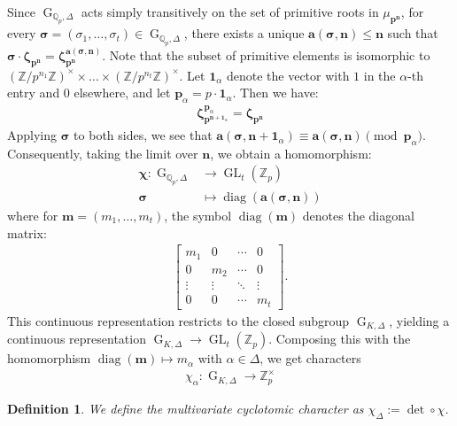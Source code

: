 \documentclass{amsart}
\newtheorem{definition}[proposition]{Definition}
\newcommand{\bn}{\textbf{n}}
\newcommand{\bm}{\textbf{m}}
\newcommand{\bp}{\textbf{p}}
\newcommand{\ba}{\textbf{a}}
\DeclareMathOperator{\G}{G}
\DeclareMathOperator{\GL}{GL}
\DeclareMathOperator{\diag}{diag}
\begin{document}
Since $\G_{\mathbb{Q}_p,\Delta}$ acts simply transitively on the set of primitive roots in $\mu_{\bp^{\bn}}$, for every $\boldsymbol\sigma=(\sigma_1,\dots,\sigma_t) \in \G_{\mathbb{Q}_p,\Delta}$, there exists a unique $\ba(\boldsymbol\sigma,\bn) \leq \bn$ such that $\boldsymbol\sigma \cdot \boldsymbol\zeta_{\bp^\bn} = \boldsymbol\zeta^{\ba(\boldsymbol\sigma,\bn)}_{\bp^{\bn}}$. Note that the subset of primitive elements is isomorphic to $(\mathbb{Z}/p^{n_1}\mathbb{Z})^{\times} \times \dots \times (\mathbb{Z}/p^{n_t}\mathbb{Z})^\times$. Let $\boldsymbol{1}_\alpha$ denote the vector with $1$ in the $\alpha$-th entry and $0$ elsewhere, and let $\bp_\alpha = p \cdot \boldsymbol{1}_\alpha$. Then we have:
\begin{align*}
    \boldsymbol\zeta^{\bp_\alpha}_{\bp^{\bn+\boldsymbol{1}_\alpha}} = \boldsymbol\zeta_{\bp^\bn}
\end{align*}
Applying $\boldsymbol{\sigma}$ to both sides, we see that $\ba(\boldsymbol\sigma,\bn+\boldsymbol{1}_\alpha) \equiv \ba(\boldsymbol{\sigma},\bn) \pmod{\bp_\alpha}$. Consequently, taking the limit over $\bn$, we obtain a homomorphism:
\begin{align*}
   \boldsymbol{\chi}: \G_{\mathbb{Q}_p,\Delta} &\to \GL_t(\mathbb{Z}_p) \\
   \boldsymbol{\sigma} &\mapsto \diag(\ba(\boldsymbol\sigma,\bn))
\end{align*}
where for $\textbf{m}=(m_1,\dots,m_t)$, the symbol $\diag(\textbf{m})$ denotes the diagonal matrix:
\begin{align*}
    \begin{bmatrix}
      m_1 & 0   & \cdots & 0 \\
      0   & m_2 & \cdots & 0 \\
      \vdots & \vdots &\ddots & \vdots \\
      0 & 0 & \cdots & m_t
    \end{bmatrix}.
\end{align*}
This continuous representation restricts to the closed subgroup $\G_{K,\Delta}$, yielding a continuous representation $\G_{K,\Delta} \to \GL_t(\mathbb{Z}_p)$. Composing this with the homomorphism $\diag(\bm)\mapsto m_\alpha$ with $\alpha\in\Delta$, we get characters
\begin{align*}
    \chi_\alpha:\G_{K,\Delta}\to\mathbb{Z}^\times_p
\end{align*}

\begin{definition}
    We define the \emph{multivariate cyclotomic character} as $\chi_\Delta:=\det\circ\chi$.
\end{definition}
\end{document}
